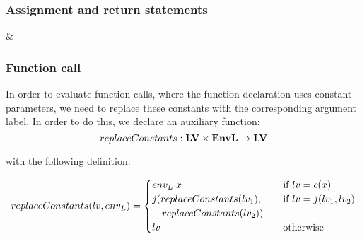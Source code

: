 \subsubsection{Assignment and return statements}
\begin{semanticequations}
 \seSpace
& \seSpace
\end{semanticequations}

\subsubsection{Function call}
In order to evaluate function calls, where the function declaration uses constant parameters, we need to replace these constants with the corresponding argument label.
In order to do this, we declare an auxiliary function:
\[ replaceConstants : \mathbf{LV} \times \mathbf{EnvL} \rightarrow \mathbf{LV} \]

with the following definition:

\[replaceConstants(lv, {env_L}) = \begin{cases}
  {env_L} \; x & \quad \text{if } lv = c(x) \\
  j(replaceConstants(lv_1), & \quad \text{if } lv = j(lv_1, lv_2) \\
  \quad replaceConstants(lv_2)) & \\
  lv & \quad \text{otherwise}
\end{cases} \]

